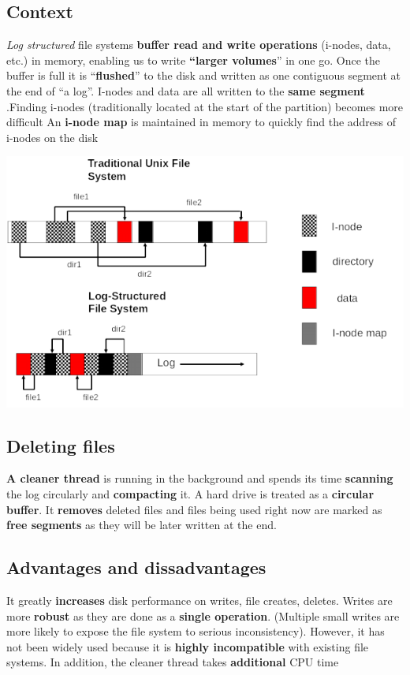 \documentclass{article}
\begin{document}
\subsection{Context}
\begin{flushleft}
\textit{Log structured} file systems \textbf{buffer read and write operations} (i-nodes, data, etc.) in memory, enabling us to write \textbf{“larger volumes}” in one go. Once the buffer is full it is “\textbf{flushed}” to the disk and written as one contiguous segment at the end of “a log”. I-nodes and data are all written to the \textbf{same segment} .Finding i-nodes (traditionally located at the start of the partition) becomes more difficult An \textbf{i-node map} is maintained in memory to quickly find the address of i-nodes on the disk
\end{flushleft}
\begin{center}
	\includegraphics[scale=0.5]{log_fs.png}
\end{center}

\subsection{Deleting files}
\begin{flushleft}
\textbf{A cleaner thread} is running in the background and spends its time \textbf{scanning} the log circularly and \textbf{compacting} it. A hard drive is treated as a \textbf{circular buffer}. It \textbf{removes} deleted files and files being used right now are marked as \textbf{free segments} as they will be later written at the end.
\end{flushleft}

\subsection{Advantages and dissadvantages}
\begin{flushleft}
It greatly \textbf{increases} disk performance on writes, file creates, deletes. Writes are more \textbf{robust} as they are done as a \textbf{single operation}. (Multiple small writes are more likely to expose the file system to serious inconsistency). However, it has not been widely used because it is \textbf{highly incompatible} with existing file systems. In addition, the cleaner thread takes \textbf{additional} CPU time
\end{flushleft}
\end{document}
